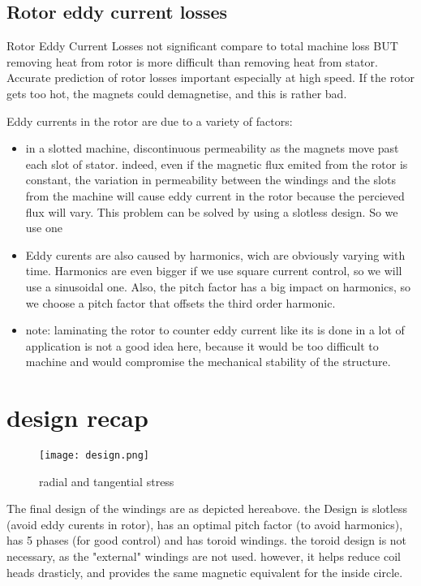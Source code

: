 \begin{enumerate}
\begin{itemize}
    \end{itemize}
\end{enumerate}





\subsection{Rotor eddy current losses}
Rotor Eddy Current Losses not significant compare to total machine loss BUT removing heat from rotor is more difficult than removing heat from stator.  Accurate prediction of rotor losses important especially at high speed. If the rotor gets too hot, the magnets could demagnetise, and this is rather bad. 

Eddy currents in the rotor are due to a variety of factors:
\begin{itemize}
    \item in a slotted machine, discontinuous permeability as the magnets move past each slot of stator. indeed, even if the magnetic flux emited from the rotor is constant, the variation in permeability between the windings and the slots from the machine will cause eddy current in the rotor because the percieved flux will vary. This problem can be solved by using a slotless design. So we use one
    \item Eddy curents are also caused by harmonics, wich are obviously varying with time. Harmonics are even bigger if we use square current control, so we will use a sinusoidal one. Also, the pitch factor has a big impact on harmonics, so we choose a pitch factor that offsets the third order harmonic. 
    \item note: laminating the rotor to counter eddy current like its is done in a lot of application is not a good idea here, because it would be too difficult to machine and would compromise the mechanical stability of the structure. 
\end{itemize}
\section{design recap}

\begin{figure}[H]
    \centering
    \texttt{[image: design.png]}
    \caption{radial and tangential stress}
\end{figure}

The final design of the windings are as depicted hereabove. the Design is slotless (avoid eddy curents in rotor), has an optimal pitch factor (to avoid harmonics), has 5 phases (for good control) and has toroid windings. the toroid design is not necessary, as the "external" windings are not used. however, it helps reduce coil heads drasticly, and provides the same magnetic equivalent for the inside circle. 


